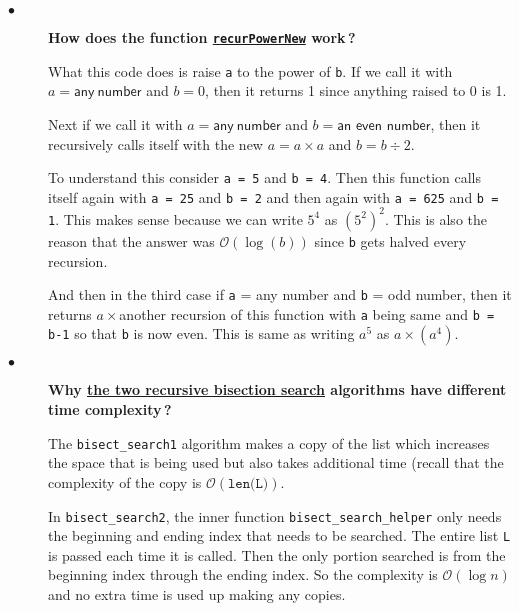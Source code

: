 \documentclass{article}
\newcommand{\inlinecode}[1]{\texttt{#1}}
\newcommand{\link}[2]{\textcolor{blue}{\href{#2}{#1}}}
\newcommand{\question}[1]{\item[$\bullet$] 
	\begin{minipage}[t]{\textwidth}
		\bfseries#1
	\end{minipage}
	\hfil
}
\newenvironment{answer}{}{}
\newenvironment{faq}{\begin{description}}{\end{description}}
\begin{document}
\begin{faq}
		\question{How does the function \link{\inlinecode{recurPowerNew}}{https://courses.edx.org/courses/course-v1:MITx+6.00.1x+2T2017_2/jump_to/block-v1:MITx+6.00.1x+2T2017_2+type@vertical+block@4685adb29e1044629e190a16f292c0bf} work\,?}
		\begin{answer}
			What this code does is raise \inlinecode{a} to the power of \inlinecode{b}. If we call it with $a = \mathsf{any\ number}$ and $b = 0$, then it returns 1 since anything raised to 0 is 1.
			
			Next if we call it with $a = \mathsf{any\ number}$ and $b = \textsf{an\ even\ number}$, then it recursively calls itself with the new $a = a \times a$ and $b = b \div 2$.
			
			To understand this consider \inlinecode{a = 5} and \inlinecode{b = 4}. Then this function calls itself again with \inlinecode{a = 25} and \inlinecode{b = 2} and then again with \inlinecode{a = 625} and \inlinecode{b = 1}. This makes sense because we can write $5^4$ as $(5^2)^2$. This is also the reason that the answer was $\mathcal{O}(\log(b))$ since \inlinecode{b} gets halved every recursion.
			
			And then in the third case if \inlinecode{a} = any number and \inlinecode{b} = odd number, then it returns \(a \times {} \)another recursion of this function with \inlinecode{a} being same and \inlinecode{b = b-1} so that \inlinecode{b} is now even. This is same as writing $a^5$ as $a \times (a^4)$.
		\end{answer}
		
		\question{Why \link{the two recursive bisection search}{https://courses.edx.org/courses/course-v1:MITx+6.00.1x+2T2017_2/jump_to/block-v1:MITx+6.00.1x+2T2017_2+type@vertical+block@d5dba301968c438b94287873177097da} algorithms have different time complexity\,?}
		\begin{answer}
			The \inlinecode{bisect_search1} algorithm makes a copy of the list which increases the space that is being used but also takes additional time (recall that the complexity of the copy is $\mathcal{O}(\inlinecode{len(L)})$.
			
			In \inlinecode{bisect_search2}, the inner function \inlinecode{bisect_search_helper} only needs the beginning and ending index that needs to be searched. The entire list \inlinecode{L} is passed each time it is called. Then the only portion searched is from the beginning index through the ending index. So the complexity is $\mathcal{O}(\log n)$ and no extra time is used up making any copies.
		\end{answer}
	\end{faq}
	
\end{document}
